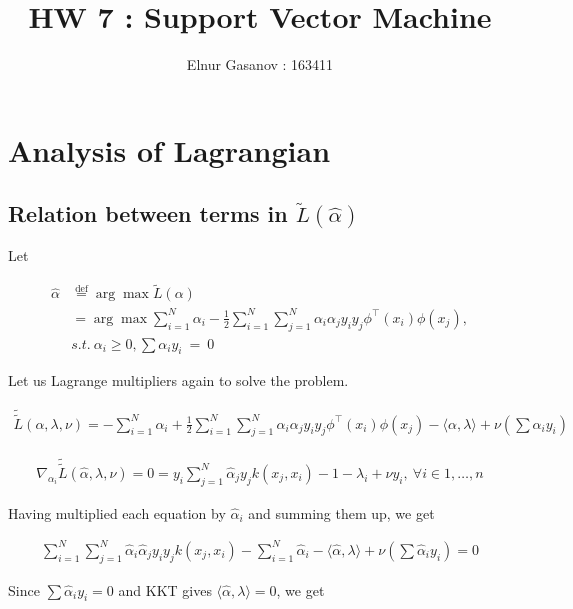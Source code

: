 \documentclass{article}
\author{Elnur Gasanov : 163411}
\title{HW 7 : Support Vector Machine}
\begin{document}
\maketitle

\section{Analysis of Lagrangian}

\subsection{Relation between terms in $\widetilde{L}(\hat{\alpha})$}

Let 

\begin{align*}
\hat{\alpha} & \overset{\text{def}}{=} \arg\max \widetilde{L}(\alpha)\\ 
& = \arg\max \sum\limits_{i=1}^N \alpha_i - \frac12 \sum\limits_{i=1}^N \sum\limits_{j=1}^N \alpha_i \alpha_j y_i y_j \phi^\intercal(x_i) \phi(x_j), \\
& s.t. \ \alpha_i \geq 0, \sum \alpha_i y_i~=~0
\end{align*}

Let us Lagrange multipliers again to solve the problem.

\begin{align*}
\widetilde{\widetilde{L}} (\alpha, \lambda, \nu) = -\sum\limits_{i=1}^N \alpha_i + \frac12 \sum\limits_{i=1}^N \sum\limits_{j=1}^N \alpha_i \alpha_j y_i y_j \phi^\intercal(x_i) \phi(x_j) - \langle \alpha, \lambda \rangle + \nu \left(\sum \alpha_i y_i\right)
\end{align*}

\begin{align*}
\nabla_{\alpha_i} \widetilde{\widetilde{L}}  (\hat{\alpha}, \lambda, \nu)= 0 = y_i \sum\limits_{j=1}^N \hat{\alpha}_j y_j k(x_j, x_i) - 1 - \lambda_i + \nu y_i, \ \forall i \in {1, \dots, n}
\end{align*}

Having multiplied each equation by $\hat{\alpha}_i$ and summing them up, we get

\begin{align*}
\sum\limits_{i=1}^N \sum\limits_{j=1}^N \hat{\alpha}_i \hat{\alpha}_j y_i y_j k(x_j, x_i) - \sum\limits_{i=1}^N \hat{\alpha}_i - \langle \hat{\alpha}, \lambda \rangle + \nu \left(\sum \hat{\alpha}_i y_i\right) = 0
\end{align*}

Since $\sum \hat{\alpha}_i y_i = 0$ and KKT gives $\langle \hat{\alpha}, \lambda \rangle = 0$, we get  
\end{document}
